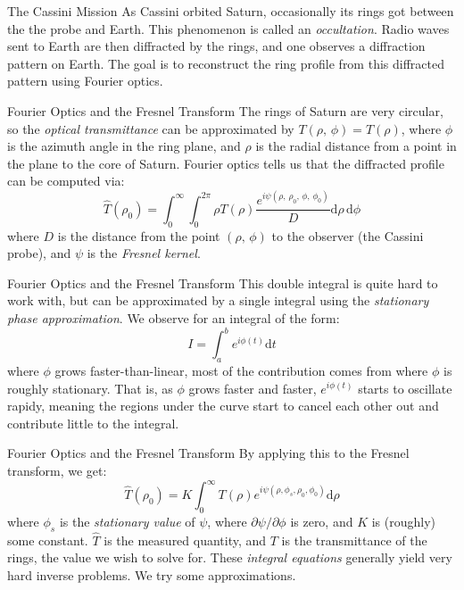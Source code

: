 \documentclass{beamer}
\begin{document}
    \begin{frame}{The Cassini Mission}
        As Cassini orbited Saturn, occasionally its rings got between the
        the probe and Earth. This phenomenon is called an \textit{occultation}.
        Radio waves sent to Earth are then diffracted by the rings, and one
        observes a diffraction pattern on Earth. The goal is to reconstruct
        the ring profile from this diffracted pattern using Fourier optics.
    \end{frame}
    \begin{frame}{Fourier Optics and the Fresnel Transform}
        The rings of Saturn are very circular, so the
        \textit{optical transmittance} can be approximated by
        $T(\rho,\,\phi)=T(\rho)$, where $\phi$ is the azimuth angle in the
        ring plane, and $\rho$ is the radial distance from a point in the
        plane to the core of Saturn. Fourier optics tells us that the
        diffracted profile can be computed via:
        \begin{equation}
            \hat{T}(\rho_{0})=
                \int_{0}^{\infty}\int_{0}^{2\pi}
                    \rho{T}(\rho)
                    \frac{e^{i\psi(\rho,\,\rho_{0},\,\phi,\,\phi_{0})}}{D}
                    \textrm{d}\rho\,\textrm{d}\phi
        \end{equation}
        where $D$ is the distance from the point $(\rho,\,\phi)$ to the
        observer (the Cassini probe), and $\psi$ is the
        \textit{Fresnel kernel}.
    \end{frame}
    \begin{frame}{Fourier Optics and the Fresnel Transform}
        This double integral is quite hard to work with, but can be approximated
        by a single integral using the \textit{stationary phase approximation}.
        We observe for an integral of the form:
        \begin{equation}
            I=\int_{a}^{b}e^{i\phi(t)}\textrm{d}t
        \end{equation}
        where $\phi$ grows faster-than-linear, most of the contribution comes
        from where $\phi$ is roughly stationary. That is, as $\phi$ grows
        faster and faster, $e^{i\phi(t)}$ starts to oscillate rapidy, meaning
        the regions under the curve start to cancel each other out and
        contribute little to the integral.
    \end{frame}
    \begin{frame}{Fourier Optics and the Fresnel Transform}
        By applying this to the Fresnel transform, we get:
        \begin{equation}
            \hat{T}(\rho_{0})=K\int_{0}^{\infty}
                T(\rho)e^{i\psi(\rho,\phi_{s},\rho_{0},\phi_{0})}\textrm{d}\rho
        \end{equation}
        where $\phi_{s}$ is the \textit{stationary value} of $\psi$, where
        $\partial\psi/\partial\phi$ is zero, and $K$ is (roughly) some constant.
        $\hat{T}$ is the measured quantity, and $T$ is the transmittance of the
        rings, the value we wish to solve for. These \textit{integral equations}
        generally yield very hard inverse problems. We try some approximations.
    \end{frame}
\end{document}
